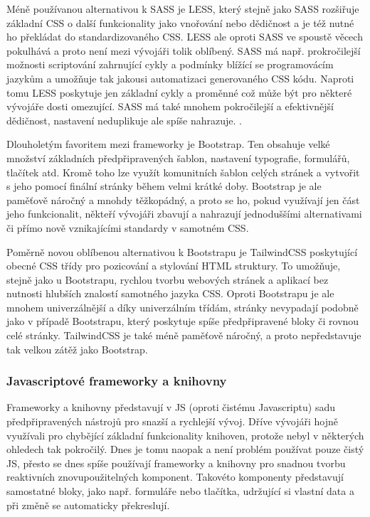 		Méně používanou alternativou k \Ac{SASS} je \Ac{LESS}, který stejně jako \Ac{SASS} rozšiřuje základní \Ac{CSS}
		o další funkcionality jako vnořování nebo dědičnost a je též nutné ho překládat do standardizovaného \Ac{CSS}. \cite{less_overview}
		\Ac{LESS} ale oproti \Ac{SASS} ve spoustě věcech pokulhává a proto není mezi vývojáři tolik oblíbený.
		\Ac{SASS} má např. prokročilejší možnosti scriptování zahrnující cykly a podmínky blížící se programovácím jazykům
		a umožňuje tak jakousi automatizaci generovaného \Ac{CSS} kódu.
		Naproti tomu \Ac{LESS} poskytuje jen základní cykly a proměnné což může být pro některé vývojáře dosti omezující.
		\Ac{SASS} má také mnohem pokročilejší a efektivnější dědičnost, nastavení neduplikuje ale spíše nahrazuje. \cite{sass_vs_less}.

		Dlouholetým favoritem mezi frameworky je Bootstrap.
		Ten obsahuje velké množství základních předpřipravených šablon, nastavení typografie, formulářů, tlačítek atd.
		Kromě toho lze využít komunitních šablon celých stránek a vytvořit s jeho pomocí finální stránky během velmi krátké doby.
		Bootstrap je ale paměťově náročný a mnohdy těžkopádný, a proto se ho, pokud využívají jen část jeho funkcionalit,
		někteří vývojáři zbavují a nahrazují jednoduššími alternativami či přímo nově vznikajícími standardy
		v samotném \Ac{CSS}. \cite{bootstrap}

		Poměrně novou oblíbenou alternativou k Bootstrapu je TailwindCSS poskytující obecné \Ac{CSS} třídy pro
		pozicování a stylování \Ac{HTML} struktury.
		To umožňuje, stejně jako u Bootstrapu, rychlou tvorbu webových stránek a aplikací bez nutnosti hlubších znalostí
		samotného jazyka \Ac{CSS}. \cite{tailwindcss}
		Oproti Bootstrapu je ale mnohem univerzálnější a díky univerzálním třídám, stránky nevypadají podobně jako v případě
		Bootstrapu, který poskytuje spíše předpřipravené bloky či rovnou celé stránky.
		TailwindCSS je také méně paměťově náročný, a proto nepředstavuje tak velkou zátěž jako Bootstrap.
		\cite{tailwindcss_vs_bootstrap}

		\subsubsection{Javascriptové frameworky a knihovny}

		Frameworky a knihovny představují v \ac{JS} (oproti čistému Javascriptu) sadu předpřipravených nástrojů pro snazší a rychlejší vývoj.
		Dříve vývojáři hojně využívali pro chybějící základní funkcionality knihoven, protože nebyl v některých ohledech tak
		pokročilý.
		Dnes je tomu naopak a není problém používat pouze čistý \ac{JS}, přesto se dnes spíše
		používají frameworky a knihovny pro snadnou tvorbu reaktivních znovupoužitelných komponent.
		Takovéto komponenty představují samostatné bloky, jako např. formuláře nebo tlačítka, udržující si vlastní
		data a při změně se automaticky překreslují.

